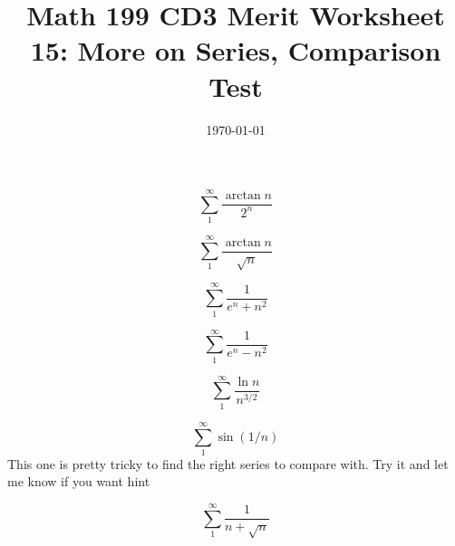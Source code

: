 
\usepackage{fullpage,amsmath,amssymb,amsthm}

\newcommand{\D}{\displaystyle}

\title{Math 199 CD3 Merit Worksheet 15: More on Series, Comparison Test}
\date{\today}




\maketitle

\be

	\item $$\sum_1^\infty \frac{\arctan n}{2^n}$$
	\vfill
	\item $$\sum_1^\infty \frac{\arctan n}{\sqrt n}$$
	\vfill
	\item $$\sum_1^\infty\frac{1}{e^n+n^2}$$
	\vfill
	\item $$\sum_1^\infty\frac{1}{e^n-n^2}$$
	\vfill
	\newpage
	\item $$\sum_1^\infty\frac{\ln n}{n^{3/2}}$$
	\vfill
	\item $$\sum_1^\infty \sin(1/n)$$
	This one is pretty tricky to find the right series to compare with. Try it and let me know if you want hint
	\vfill
	\item $$\sum_1^\infty \frac{1}{n+\sqrt n}$$
	\vfill
\ee


